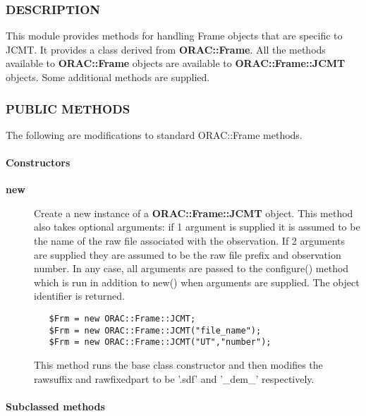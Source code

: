 \begin{description}
\subsubsection*{DESCRIPTION\label{ORAC::Frame::JCMT_DESCRIPTION}}


This module provides methods for handling Frame objects that
are specific to JCMT. It provides a class derived from \textbf{ORAC::Frame}.
All the methods available to \textbf{ORAC::Frame} objects are available
to \textbf{ORAC::Frame::JCMT} objects. Some additional methods are supplied.

\subsubsection*{PUBLIC METHODS\label{ORAC::Frame::JCMT_PUBLIC_METHODS}}


The following are modifications to standard ORAC::Frame methods.

\paragraph*{Constructors\label{ORAC::Frame::JCMT_Constructors}}
\begin{description}

\item[{\textbf{new}}] \mbox{}

Create a new instance of a \textbf{ORAC::Frame::JCMT} object.
This method also takes optional arguments:
if 1 argument is  supplied it is assumed to be the name
of the raw file associated with the observation. If 2 arguments
are supplied they are assumed to be the raw file prefix and
observation number. In any case, all arguments are passed to
the configure() method which is run in addition to new()
when arguments are supplied.
The object identifier is returned.

\begin{verbatim}
   $Frm = new ORAC::Frame::JCMT;
   $Frm = new ORAC::Frame::JCMT("file_name");
   $Frm = new ORAC::Frame::JCMT("UT","number");
\end{verbatim}


This method runs the base class constructor and then modifies
the rawsuffix and rawfixedpart to be '.sdf' and '\_dem\_'
respectively.

\end{description}
\paragraph*{Subclassed methods\label{ORAC::Frame::JCMT_Subclassed_methods}}



\end{description}

